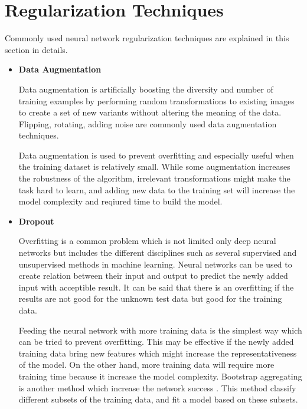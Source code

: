 \section{Regularization Techniques}

        Commonly used neural network regularization techniques are explained in this section in details.

        \begin{itemize}

            \item \textbf{Data Augmentation}

                Data augmentation is artificially boosting the diversity and number of training examples by performing random transformations to existing images to create a set of new variants without altering the meaning of the data.
                Flipping, rotating, adding noise are commonly used data augmentation techniques.

                Data augmentation is used to prevent overfitting and especially useful when the training dataset is relatively small.
                While some augmentation increases the robustness of the algorithm, irrelevant transformations might make the task hard to learn, and adding new data to the training set will increase the model complexity and reqiured time to build the model.

            \item \textbf{Dropout}

                Overfitting is a common problem which is not limited only deep neural networks but includes the different disciplines such as several supervised and unsupervised methods in machine learning.
                Neural networks can be used to create relation between their input and output to predict the newly added input with acceptible result.
                It can be said that there is an overfitting if the results are not good for the unknown test data but good for the training data.

                Feeding the neural network with more training data is the simplest way which can be tried to prevent overfitting.
                This may be effective if the newly added training data bring new features which might increase the representativeness of the model.
                On the other hand, more training data will require more training time because it increase the model complexity.
                Bootstrap aggregating is another method which increase the network success \cite{breiman1996bagging}.
                This method classify different subsets of the training data, and fit a model based on these subsets.


\end{itemize}
